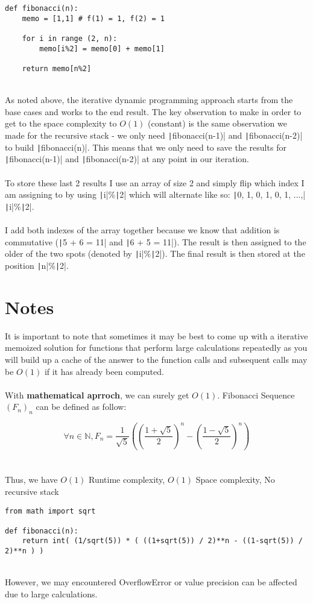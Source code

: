 \documentclass{article}
\newcommand{\inlinecode}[1]{\texttt|#1|}
\newcommand{\moduloinsidecode}[2]{\inlinecode{#1}\%\inlinecode{#2}}
\begin{document}
			\begin{verbatim}
def fibonacci(n):
	memo = [1,1] # f(1) = 1, f(2) = 1
	
	for i in range (2, n):
		memo[i%2] = memo[0] + memo[1]
		
	return memo[n%2]
			\end{verbatim}
			\\
			As noted above, the iterative dynamic programming approach starts from the base cases and works to the end result. The key observation to make in order to get to the space complexity to $O(1)$ (constant) is the same observation we made for the recursive stack - we only need \inlinecode{fibonacci(n-1)} and \inlinecode{fibonacci(n-2)} to build \inlinecode{fibonacci(n)}. This means that we only need to save the results for \inlinecode{fibonacci(n-1)} and \inlinecode{fibonacci(n-2)} at any point in our iteration.
			\\
			\\
			To store these last 2 results I use an array of size 2 and simply ﬂip which index I am assigning to by using \moduloinsidecode{i}{2} which will alternate like so: \inlinecode{0, 1, 0, 1, 0, 1, ...,} \moduloinsidecode{i}{2}.
			\\
			\\
			I add both indexes of the array together because we know that addition is commutative (\inlinecode{5 + 6 = 11} and \inlinecode{6 + 5 = 11}). The result is then assigned to the older of the two spots (denoted by \moduloinsidecode{i}{2}). The ﬁnal result is then stored at
			the position \moduloinsidecode{n}{2}.
			
	\section{Notes}
	
		It is important to note that sometimes it may be best to come up with a iterative memoized solution for functions that perform large calculations repeatedly as you will build up a cache of the answer to the function calls and subsequent calls may be $O(1)$ if it has already been computed.
		\\
		\\
		With \textbf{mathematical aprroch}, we can surely get $O(1)$. Fibonacci Sequence $(F_n)_n$ can be defined as follow:
		
		\[
			\forall n \in \mathbb{N}, F_n = \frac{1}{\sqrt{5}} 
			\left(
				\left(\frac{1 + \sqrt{5}}{2}\right)^n - \left(\frac{1 - \sqrt{5}}{2}\right)^n
			\right)
		\]
		\\
		\\
		Thus, we have $O(1)$ Runtime complexity, $O(1)$ Space complexity, No recursive stack
		
		\begin{verbatim}
from math import sqrt

def fibonacci(n):
	return int( (1/sqrt(5)) * ( ((1+sqrt(5)) / 2)**n - ((1-sqrt(5)) / 2)**n ) )
		\end{verbatim}
		\\
		However, we may encountered OverflowError or value precision can be affected due to large calculations. 
			
\end{document}
